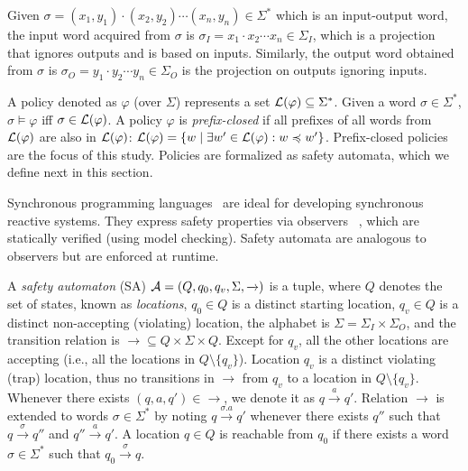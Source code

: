 Given  $\sigma= (x_1,y_1)\cdot(x_2,y_2)\cdots(x_n,y_n) \in \Sigma^*$ which is an input-output word, the input word acquired from $\sigma$ is $\sigma_I = x_1 \cdot x_2 \cdots x_n \in \Sigma_I$, which is a projection that ignores outputs and is based on inputs.
Similarly, the output word obtained from $\sigma$ is $\sigma_O = y_1 \cdot y_2 \cdots y_n \in \Sigma_O$ is the projection on outputs ignoring inputs.


A policy denoted as $\varphi$ (over $\Sigma$) represents a set ${\cal L}(\varphi)\subseteq \Sigma^{*}$.
Given a word $\sigma \in \Sigma^*$, $\sigma \models \varphi$ iff $\sigma\in{\cal L}(\varphi)$.
A {policy} $\varphi$ is {\em prefix-closed} if all prefixes of all words from
${\cal L}(\varphi)$ are also in ${\cal L}(\varphi)$: ${\cal L}(\varphi) = \{w\;|\;\exists w'\in{\cal L}(\varphi): w\preccurlyeq w'\}$.
Prefix-closed policies are the focus of this study.
Policies are formalized as safety automata, which we define next in
this section.



Synchronous programming languages~\cite{BenvenisteCEHLd03} are ideal for developing synchronous reactive systems.
They express safety properties via observers ~\cite{HalbwachsLR94}, which are statically verified (using model checking). Safety automata are analogous to observers but are enforced at runtime.

\begin{definition}
	\label{def:SA}
	A \emph{safety automaton} (SA) ${\cal A} =(Q, q_0, q_v, \Sigma, \xrightarrow{})$ is a tuple, where $Q$ denotes the set of states, known as \emph{locations}, $q_0 \in Q$ is a distinct starting location, $q_v \in Q$ is a distinct non-accepting (violating) location, the alphabet is $\Sigma=\Sigma_I\times\Sigma_O$, and the transition relation is $\xrightarrow{} \subseteq Q \times \Sigma \times Q$.
	Except for  $q_v$, all the other locations are accepting  (i.e., all the locations in $Q \setminus \{q_v\}$).
	Location $q_v$ is a distinct violating (trap) location, thus no transitions in $\xrightarrow{}$ from $q_v$ to a location in $Q \setminus \{q_v\}$.
	Whenever there exists $(q, a, q') \in \xrightarrow{}$, we denote it as $q \xrightarrow{a} q'$.
	Relation $\xrightarrow{}$ is extended to words $\sigma \in \Sigma^*$ by noting
	$q \xrightarrow{\sigma . a} q'$ whenever there exists $q''$ such that $q
	\xrightarrow{\sigma} q''$ and $q'' \xrightarrow{a} q'$.
	A location $q\in Q$ is reachable from $q_0$ if there exists a word $\sigma \in \Sigma^*$ such that $q_0
	\xrightarrow{\sigma} q$.
\end{definition}

